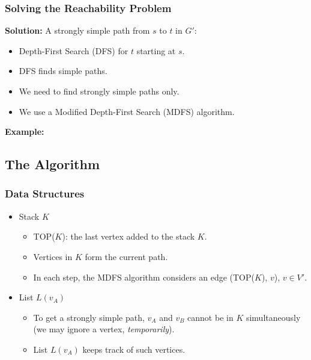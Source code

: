 \documentclass[pdftex]{beamer}
\newcommand{\subbullet}{\color{mypurple}\scriptsize\ding{235}}
\begin{document}
\begin{frame} \frametitle{Solving the Reachability Problem}
  \textbf{Solution:} A strongly simple path from $s$ to $t$ in $G'$:
  \begin{itemize}
  \item Depth-First Search (DFS) for $t$ starting at $s$.
  \item DFS finds simple paths.
  \item We need to find strongly simple paths only.
  \item We use a Modified Depth-First Search (MDFS) algorithm.
  \end{itemize}

  \vspace{1ex}
  \textbf{Example:}
  \vspace{-1ex}
  \begin{center}
    
  \end{center}
\end{frame}

\subsection{The Algorithm}

\begin{frame} \frametitle{Data Structures}
  \begin{itemize}
  \item Stack $K$
    \begin{itemize}
    \item[\subbullet] \textrm{TOP($K$)}: the last vertex added to the stack $K$.
    \item[\subbullet] Vertices in $K$ form the current path.
    \item[\subbullet] In each step, the MDFS algorithm considers an
      edge \textrm{(TOP($K$), $v$)}, $v \in V'$.
    \end{itemize}
    \vspace{3ex}
  \item List $L(v_A)$
    \begin{itemize}
    \item[\subbullet] To get a strongly simple path, $v_A$ and $v_B$
      cannot be in $K$ simultaneously (we may ignore a vertex,
      \emph{temporarily}).
    \item[\subbullet] List $L(v_A)$ keeps track of such vertices.
    \end{itemize}
  \end{itemize}
\end{frame}
\end{document}
